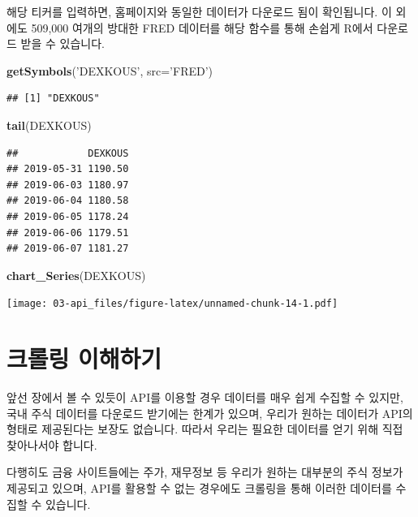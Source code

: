 \documentclass[]{book}
\newenvironment{Shaded}{\begin{snugshade}}{\end{snugshade}}
\newcommand{\DataTypeTok}[1]{\textcolor[rgb]{0.13,0.29,0.53}{#1}}
\newcommand{\KeywordTok}[1]{\textcolor[rgb]{0.13,0.29,0.53}{\textbf{#1}}}
\newcommand{\NormalTok}[1]{#1}
\newcommand{\StringTok}[1]{\textcolor[rgb]{0.31,0.60,0.02}{#1}}
\begin{document}
해당 티커를 입력하면, 홈페이지와 동일한 데이터가 다운로드 됨이 확인됩니다. 이 외에도 509,000 여개의 방대한 FRED 데이터를 해당 함수를 통해 손쉽게 R에서 다운로드 받을 수 있습니다.

\begin{Shaded}
\begin{Highlighting}[]
\KeywordTok{getSymbols}\NormalTok{(}\StringTok{'DEXKOUS'}\NormalTok{, }\DataTypeTok{src=}\StringTok{'FRED'}\NormalTok{)}
\end{Highlighting}
\end{Shaded}

\begin{verbatim}
## [1] "DEXKOUS"
\end{verbatim}

\begin{Shaded}
\begin{Highlighting}[]
\KeywordTok{tail}\NormalTok{(DEXKOUS)}
\end{Highlighting}
\end{Shaded}

\begin{verbatim}
##            DEXKOUS
## 2019-05-31 1190.50
## 2019-06-03 1180.97
## 2019-06-04 1180.58
## 2019-06-05 1178.24
## 2019-06-06 1179.51
## 2019-06-07 1181.27
\end{verbatim}

\begin{Shaded}
\begin{Highlighting}[]
\KeywordTok{chart_Series}\NormalTok{(DEXKOUS)}
\end{Highlighting}
\end{Shaded}

\texttt{[image: 03-api\_files/figure-latex/unnamed-chunk-14-1.pdf]}

\hypertarget{section-12}{%
\chapter{크롤링 이해하기}\label{section-12}}

앞선 장에서 볼 수 있듯이 API를 이용할 경우 데이터를 매우 쉽게 수집할 수 있지만, 국내 주식 데이터를 다운로드 받기에는 한계가 있으며, 우리가 원하는 데이터가 API의 형태로 제공된다는 보장도 없습니다. 따라서 우리는 필요한 데이터를 얻기 위해 직접 찾아나서야 합니다.

다행히도 금융 사이트들에는 주가, 재무정보 등 우리가 원하는 대부분의 주식 정보가 제공되고 있으며, API를 활용할 수 없는 경우에도 크롤링을 통해 이러한 데이터를 수집할 수 있습니다.
\end{document}
